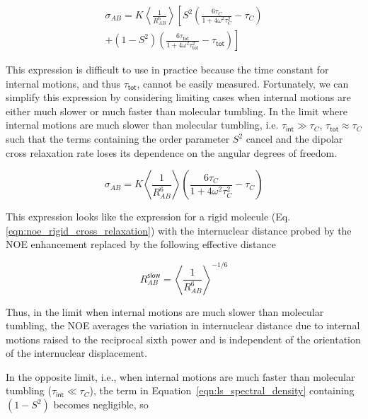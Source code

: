 \documentclass[9pt,review]{livecoms}
\begin{document}
\begin{equation}
\label{eqn:ls_cross_relaxation}
\begin{gathered}
\sigma_{AB} = K \left \langle \frac {1} {R_{AB}^6} \right \rangle \left[ S^2 \left( \frac {6 \tau_C} {1 + 4 \omega^2 \tau_C^2} - \tau_C \right) \right. \\
\left. + (1 - S^2) \left( \frac {6 \tau_{\mathsf{tot}}} {1 + 4 \omega^2 \tau_{\mathsf{tot}}^2} - \tau_{\mathsf{tot}} \right) \right]
\end{gathered}
\end{equation}

This expression is difficult to use in practice because the time constant for internal motions, and thus $\tau_{\mathsf{tot}}$, cannot be easily measured.
Fortunately, we can simplify this expression by considering limiting cases when internal motions are either much slower or much faster than molecular tumbling.
In the limit where internal motions are much slower than molecular tumbling, i.e. $\tau_{\mathsf{int}} \gg \tau_C$, $\tau_{\mathsf{tot}} \approx \tau_C$ such that the terms containing the order parameter $S^2$ cancel and the dipolar cross relaxation rate loses its dependence on the angular degrees of freedom.

\begin{equation}
\label{eqn:ls_slow_cross_relaxation}
\sigma_{AB} = K \left \langle \frac {1} {R_{AB}^6} \right \rangle \left( \frac {6 \tau_C} {1 + 4 \omega^2 \tau_C^2} - \tau_C \right)
\end{equation}

\noindent This expression looks like the expression for a rigid molecule (Eq. \ref{eqn:noe_rigid_cross_relaxation}) with the internuclear distance probed by the NOE enhancement replaced by the following effective distance

\begin{equation}
\label{eqn:ls_slow_effective_distance}
R_{AB}^{\mathsf{slow}} = \left \langle \frac {1} {R_{AB}^6} \right \rangle^{-1/6}
\end{equation}

\noindent Thus, in the limit when internal motions are much slower than molecular tumbling, the NOE averages the variation in internuclear distance due to internal motions raised to the reciprocal sixth power and is independent of the orientation of the internuclear displacement.

In the opposite limit, i.e.,  when internal motions are much faster than molecular tumbling ($\tau_{\mathsf{int}} \ll \tau_C$), the term in Equation~\ref{eqn:ls_spectral_density} containing $(1 - S^2)$ becomes negligible, so
\end{document}
